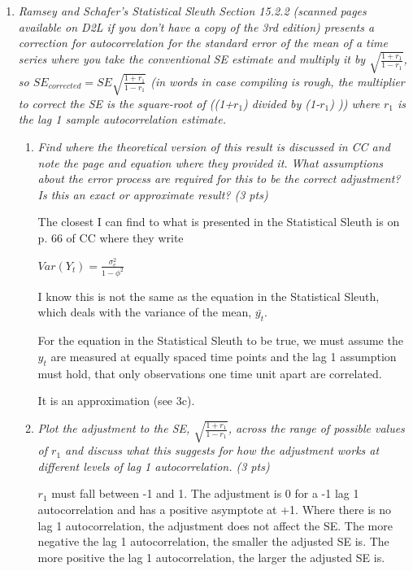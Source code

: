 \documentclass[11pt]{article}\usepackage[]{graphicx}\usepackage[]{color}
\begin{document}
\begin{enumerate}
\begin{enumerate}
\end{enumerate}

\item%
{\it Ramsey and Schafer's Statistical Sleuth Section 15.2.2 (scanned pages available on D2L if you don't have a copy of the 3rd edition) presents a correction for autocorrelation for the standard error of the mean of a time series where you take the conventional SE estimate and multiply it by $\sqrt{\frac{1+r_1}{1-r_1}}$, so $SE_{corrected}=SE\sqrt{\frac{1+r_1}{1-r_1}}$ (in words in case compiling is rough, the multiplier to correct the SE is the square-root of ((1+$r_1$) divided by (1-$r_1$) )) where $r_1$ is the lag 1 sample autocorrelation estimate.}

\begin{enumerate}
\item {\it Find where the theoretical version of this result is discussed in CC and note the page and equation where they provided it. What assumptions about the error process are required for this to be the correct adjustment? Is this an exact or approximate result? (3 pts)}

The closest I can find to what is presented in the Statistical Sleuth is on p. 66 of CC where they write

$Var(Y_{t}) = \frac{\sigma_{e}^2}{1 - \phi^2}$

I know this is not the same as the equation in the Statistical Sleuth, which deals with the variance of the mean, $\bar{y_{t}}$.

For the equation in the Statistical Sleuth to be true, we must assume the $y_{t}$ are measured at equally spaced time points and the lag 1 assumption must hold, that only observations one time unit apart are correlated.

It is an approximation (see 3c).

\item %
{\it Plot the adjustment to the SE, $\sqrt{\frac{1+r_1}{1-r_1}}$, across the range of possible values of $r_1$ and discuss what this suggests for how the adjustment works at different levels of lag 1 autocorrelation. (3 pts)}

$r_{1}$ must fall between -1 and 1. The adjustment is 0 for a -1 lag 1 autocorrelation and has a positive asymptote at +1. Where there is no lag 1 autocorrelation, the adjustment does not affect the SE. The more negative the lag 1 autocorrelation, the smaller the adjusted SE is. The more positive the lag 1 autocorrelation, the larger the adjusted SE is.


\end{enumerate}
\end{enumerate}
\end{document}
